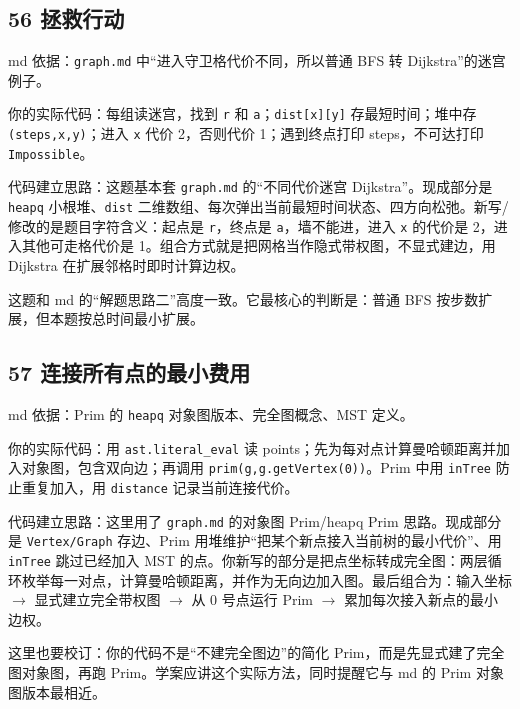 \documentclass[10pt,a4paper,fontset=none]{ctexart}
\begin{document}
\subsection{56 拯救行动}
\begin{sourcebox}
md 依据：\texttt{graph.md} 中“进入守卫格代价不同，所以普通 BFS 转 Dijkstra”的迷宫例子。
\end{sourcebox}
\begin{methodbox}
你的实际代码：每组读迷宫，找到 \texttt{r} 和 \texttt{a}；\texttt{dist[x][y]} 存最短时间；堆中存 \texttt{(steps,x,y)}；进入 \texttt{x} 代价 2，否则代价 1；遇到终点打印 steps，不可达打印 \texttt{Impossible}。

代码建立思路：这题基本套 \texttt{graph.md} 的“不同代价迷宫 Dijkstra”。现成部分是 \texttt{heapq} 小根堆、\texttt{dist} 二维数组、每次弹出当前最短时间状态、四方向松弛。新写/修改的是题目字符含义：起点是 \texttt{r}，终点是 \texttt{a}，墙不能进，进入 \texttt{x} 的代价是 2，进入其他可走格代价是 1。组合方式就是把网格当作隐式带权图，不显式建边，用 Dijkstra 在扩展邻格时即时计算边权。
\end{methodbox}
这题和 md 的“解题思路二”高度一致。它最核心的判断是：普通 BFS 按步数扩展，但本题按总时间最小扩展。

\subsection{57 连接所有点的最小费用}
\begin{sourcebox}
md 依据：Prim 的 \texttt{heapq} 对象图版本、完全图概念、MST 定义。
\end{sourcebox}
\begin{methodbox}
你的实际代码：用 \texttt{ast.literal\_eval} 读 points；先为每对点计算曼哈顿距离并加入对象图，包含双向边；再调用 \texttt{prim(g,g.getVertex(0))}。Prim 中用 \texttt{inTree} 防止重复加入，用 \texttt{distance} 记录当前连接代价。

代码建立思路：这里用了 \texttt{graph.md} 的对象图 Prim/heapq Prim 思路。现成部分是 \texttt{Vertex/Graph} 存边、Prim 用堆维护“把某个新点接入当前树的最小代价”、用 \texttt{inTree} 跳过已经加入 MST 的点。你新写的部分是把点坐标转成完全图：两层循环枚举每一对点，计算曼哈顿距离，并作为无向边加入图。最后组合为：输入坐标 $\rightarrow$ 显式建立完全带权图 $\rightarrow$ 从 0 号点运行 Prim $\rightarrow$ 累加每次接入新点的最小边权。
\end{methodbox}
这里也要校订：你的代码不是“不建完全图边”的简化 Prim，而是先显式建了完全图对象图，再跑 Prim。学案应讲这个实际方法，同时提醒它与 md 的 Prim 对象图版本最相近。
\end{document}
